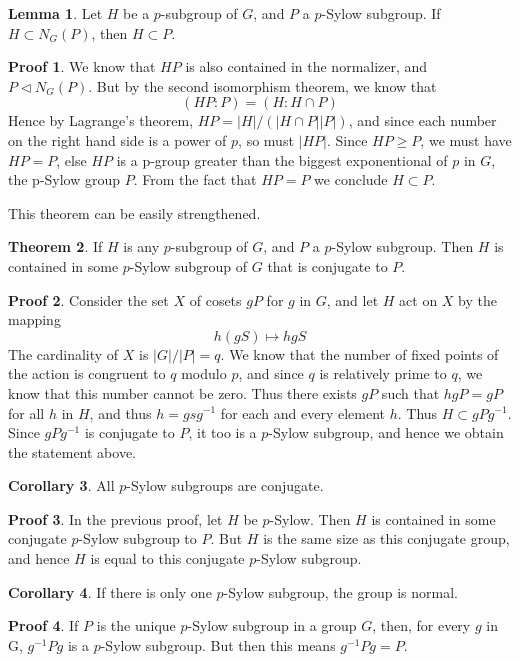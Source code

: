 \documentclass[12pt]{amsbook}
\theoremstyle{definition}
\newtheorem{theorem}{Theorem}[chapter]
\newtheorem{lemma}[theorem]{Lemma}
\newtheorem{corollary}[theorem]{Corollary}
\newtheorem*{prf}{Proof}
\begin{document}
\begin{lemma}
    Let $H$ be a $p$-subgroup of $G$, and $P$ a $p$-Sylow subgroup. If $H \subset N_G(P)$, then $H \subset P$.
\end{lemma}
\begin{prf}
    We know that $HP$ is also contained in the normalizer, and $P \lhd N_G(P)$. But by the second isomorphism theorem, we know that
    \[ (HP: P) = (H: H \cap P) \]
    Hence by Lagrange's theorem, $HP = |H|/(|H \cap P||P|)$, and since each number on the right hand side is a power of $p$, so must $|HP|$. Since $HP \geq P$, we must have $HP = P$, else $HP$ is a p-group greater than the biggest exponentional of $p$ in $G$, the p-Sylow group $P$. From the fact that $HP = P$ we conclude $H \subset P$.
\end{prf}

This theorem can be easily strengthened.

\begin{theorem}
    If $H$ is any $p$-subgroup of $G$, and $P$ a $p$-Sylow subgroup. Then $H$ is contained in some $p$-Sylow subgroup of $G$ that is conjugate to $P$.
\end{theorem}
\begin{prf}
    Consider the set $X$ of cosets $gP$ for $g$ in $G$, and let $H$ act on $X$ by the mapping
    \[ h(gS) \mapsto hgS \]
    The cardinality of $X$ is $|G|/|P| = q$. We know that the number of fixed points of the action is congruent to $q$ modulo $p$, and since $q$ is relatively prime to $q$, we know that this number cannot be zero. Thus there exists $gP$ such that $hgP = gP$ for all $h$ in $H$, and thus $h = gsg^{-1}$ for each and every element $h$. Thus $H \subset gPg^{-1}$. Since $gPg^{-1}$ is conjugate to $P$, it too is a $p$-Sylow subgroup, and hence we obtain the statement above.
\end{prf}

\begin{corollary}
    All $p$-Sylow subgroups are conjugate.
\end{corollary}
\begin{prf}
    In the previous proof, let $H$ be $p$-Sylow. Then $H$ is contained in some conjugate $p$-Sylow subgroup to $P$. But $H$ is the same size as this conjugate group, and hence $H$ is equal to this conjugate $p$-Sylow subgroup.
\end{prf}

\begin{corollary}
    If there is only one $p$-Sylow subgroup, the group is normal.
\end{corollary}
\begin{prf}
    If $P$ is the unique $p$-Sylow subgroup in a group $G$, then, for every $g$ in G, $g^{-1}Pg$ is a $p$-Sylow subgroup. But then this means $g^{-1}Pg = P$.
\end{prf}
\end{document}
